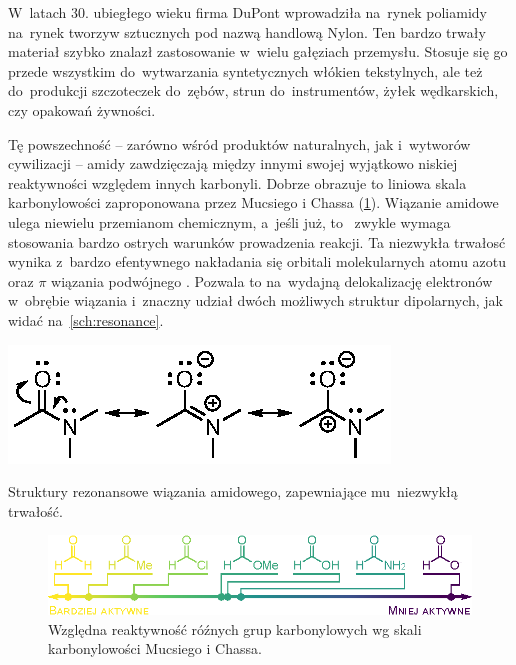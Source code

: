 W~latach 30. ubiegłego wieku firma DuPont wprowadziła na~rynek poliamidy na~rynek tworzyw sztucznych pod nazwą handlową Nylon.
Ten bardzo trwały materiał szybko znalazł zastosowanie w~wielu gałęziach przemysłu.
Stosuje się go przede wszystkim do~wytwarzania syntetycznych włókien tekstylnych,
ale też do~produkcji szczoteczek do~zębów, strun do~instrumentów, żyłek wędkarskich, czy opakowań żywności.


Tę powszechność \--- zarówno wśród produktów naturalnych, jak i~wytworów cywilizacji \---
amidy zawdzięczają między innymi swojej wyjątkowo niskiej reaktywności względem innych karbonyli.
Dobrze obrazuje to liniowa skala karbonylowości zaproponowana przez Mucsiego i Chassa (\cref{fig:carbonyl-scale})\autocite{mucsi08}.
Wiązanie amidowe ulega niewielu przemianom chemicznym, a~jeśli już, to~
zwykle wymaga stosowania bardzo ostrych warunków prowadzenia reakcji.
Ta niezwykła trwałosć wynika z~bardzo efentywnego nakładania się orbitali 
molekularnych atomu azotu oraz $\pi$ wiązania podwójnego .
Pozwala to na~wydajną delokalizację elektronów w~obrębie wiązania i~znaczny 
udział dwóch możliwych struktur dipolarnych, jak widać na~\cref{sch:resonance}.
\begin{marginscheme}
  \includegraphics{schemes/resonance}
  \caption{
    Struktury rezonansowe wiązania amidowego, zapewniające mu~niezwykłą trwałość.
  }
  \label{sch:resonance}
\end{marginscheme}

\begin{figure}
  \centering
  \includegraphics{schemes/carbonyl-scale-acc}
  \caption{
    Względna reaktywność róźnych grup karbonylowych
    wg skali karbonylowości Mucsiego i Chassa.
  }
  \label{fig:carbonyl-scale}
\end{figure}


